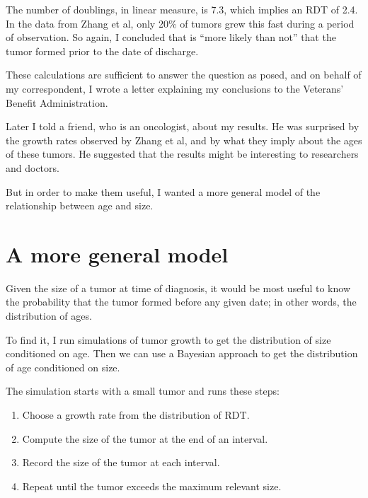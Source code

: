 \documentclass[12pt]{book}
\begin{document}
The number of doublings, in linear measure, is 7.3, which implies
an RDT of 2.4.  In the data from Zhang et al, only 20\% of tumors
grew this fast during a period of observation.  So again,
I concluded that is ``more likely than not'' that the tumor
formed prior to the date of discharge.

These calculations are sufficient to answer the question as
posed, and on behalf of my correspondent, I wrote a letter explaining
my conclusions to the Veterans' Benefit Administration.

Later I told a friend, who is an oncologist, about my results.  He was
surprised by the growth rates observed by Zhang et al, and by what
they imply about the ages of these tumors.  He suggested that the
results might be interesting to researchers and doctors.

But in order to make them useful, I wanted a more general model
of the relationship between age and size.


\section{A more general model}

Given the size of a tumor at time of diagnosis, it would be most
useful to know the probability that the tumor formed before
any given date; in other words, the distribution of ages.

To find it, I run simulations of tumor growth to get the
distribution of size conditioned on age.  Then we can use
a Bayesian approach to get the
distribution of age conditioned on size.

The simulation starts with a small tumor and runs these steps:

\begin{enumerate}

\item Choose a growth rate from the distribution of RDT.

\item Compute the size of the tumor at the end of an interval.

\item Record the size of the tumor at each interval.

\item Repeat until the tumor exceeds the maximum relevant size.

\end{enumerate}
\end{document}
